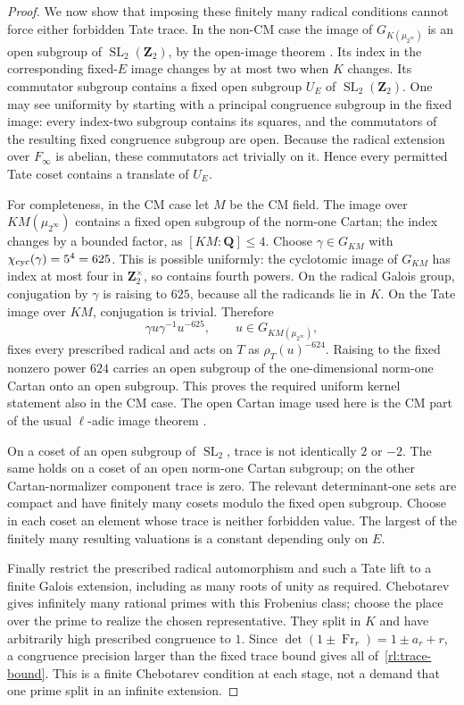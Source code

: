 \begin{proof}
We now show that imposing these finitely many radical conditions cannot
force either forbidden Tate trace.  In the non-CM case the image of
$G_{K(\mu_{2^\infty})}$ is an open subgroup of
$\operatorname{SL}_2(\mathbf Z_2)$, by the open-image theorem
\cite{Serre1972}.  Its index in the corresponding fixed-$E$ image changes
by at most two when $K$ changes.  Its commutator subgroup contains a
fixed open subgroup $U_E$ of $\operatorname{SL}_2(\mathbf Z_2)$.
One may see uniformity by starting with a principal congruence subgroup
in the fixed image: every index-two subgroup contains its squares, and
the commutators of the resulting fixed congruence subgroup are open.
Because the radical extension over $F_\infty$ is abelian, these
commutators act trivially on it.  Hence every permitted Tate coset
contains a translate of $U_E$.

For completeness, in the CM case let $M$ be the CM field.  The image over
$KM(\mu_{2^\infty})$ contains a fixed open subgroup of the norm-one
Cartan; the index changes by a bounded factor, as $[KM:\mathbf Q]\leq4$.
Choose $\gamma\in G_{KM}$ with
$\chi_{\rm cyc}(\gamma)=5^4=625$.  This is possible uniformly: the
cyclotomic image of $G_{KM}$ has index at most four in
$\mathbf Z_2^\times$, so contains fourth powers.  On the radical Galois
group, conjugation by $\gamma$ is raising to $625$, because all the
radicands lie in $K$.  On the Tate image over $KM$, conjugation is
trivial.  Therefore
\[
 \gamma u\gamma^{-1}u^{-625},\qquad
 u\in G_{KM(\mu_{2^\infty})},
\]
fixes every prescribed radical and acts on $T$ as $\rho_T(u)^{-624}$.
Raising to the fixed nonzero power $624$ carries an open subgroup of the
one-dimensional norm-one Cartan onto an open subgroup.  This proves the
required uniform kernel statement also in the CM case.  The open Cartan
image used here is the CM part of the usual $\ell$-adic image theorem
\cite[Chapter~IV, \S2.2, Remark]{Serre1968}.

On a coset of an open subgroup of $\operatorname{SL}_2$, trace is not
identically $2$ or $-2$.  The same holds on a coset of an open norm-one
Cartan subgroup; on the other Cartan-normalizer component trace is zero.
The relevant determinant-one sets are compact and have finitely many
cosets modulo the fixed open subgroup.  Choose in each coset an element
whose trace is neither forbidden value.  The largest of the finitely
many resulting valuations is a constant depending only on $E$.

Finally restrict the prescribed radical automorphism and such a Tate
lift to a finite Galois extension, including as many roots of unity as
required.  Chebotarev gives infinitely many rational primes with this
Frobenius class; choose the place over the prime to realize the chosen
representative.  They split in $K$ and have arbitrarily high prescribed
congruence to $1$.  Since
$\det(1\pm\operatorname{Fr}_r)=1\pm a_r+r$, a congruence precision
larger than the fixed trace bound gives all of~\eqref{rl:trace-bound}.
This is a finite Chebotarev condition at each stage, not a demand that
one prime split in an infinite extension.
\end{proof}

